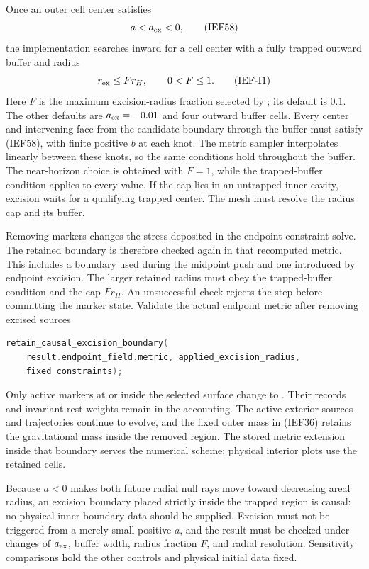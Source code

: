 Once an outer cell center satisfies
\[
 a<a_{\rm ex}<0,                                        \tag{IEF58}
\]
the implementation searches inward for a cell center with a fully trapped
outward buffer and radius
\[
 r_{\rm ex}\le F r_H,\qquad 0<F\le1.                    \tag{IEF-I1}
\]
Here \(F\) is the maximum excision-radius fraction selected by
; its default is \(0.1\).
The other defaults are \(a_{\rm ex}=-0.01\) and four outward buffer cells.
Every center and intervening face from the candidate boundary through the
buffer must satisfy (IEF58), with finite positive \(b\) at each knot.
The metric sampler interpolates linearly between these knots, so the same
conditions hold throughout the buffer.  The near-horizon choice is obtained with \(F=1\), while
the trapped-buffer condition applies to every value.  If the cap lies in an
untrapped inner cavity, excision waits for a qualifying trapped center.
The mesh must resolve the radius cap and its buffer.

Removing markers changes the stress deposited in the endpoint constraint
solve.  The retained boundary is therefore checked again in that recomputed
metric.  This includes a boundary used during the midpoint push and one
introduced by endpoint excision.  The larger retained radius must obey the
trapped-buffer condition and the cap \(F r_H\).  An unsuccessful check
rejects the step before committing the marker state.
{}
{Validate the actual endpoint metric after removing excised sources}
\begin{lstlisting}[language=C++]
retain_causal_excision_boundary(
    result.endpoint_field.metric, applied_excision_radius,
    fixed_constraints);
\end{lstlisting}

Only active markers at or inside the selected surface change to
. Their records and invariant rest weights remain
in the accounting. The active exterior sources and trajectories continue to
evolve, and the fixed outer mass in (IEF36) retains the gravitational mass
inside the removed region. The stored metric extension inside that boundary
serves the numerical scheme; physical interior plots use the retained cells.

Because \(a<0\) makes both future radial null rays move toward decreasing
areal radius, an excision boundary placed strictly inside the trapped region
is causal: no physical inner boundary data should be supplied.  Excision must
not be triggered from a merely small positive \(a\), and the result must be
checked under changes of \(a_{\rm ex}\), buffer width, radius fraction
\(F\), and radial resolution. Sensitivity comparisons hold the other
controls and physical initial data fixed.

